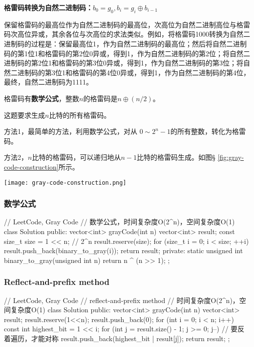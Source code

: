 \textbf{格雷码转换为自然二进制码：$b_0=g_0, b_i=g_i \oplus b_{i-1}$}

保留格雷码的最高位作为自然二进制码的最高位，次高位为自然二进制高位与格雷码次高位异或，其余各位与次高位的求法类似。例如，将格雷码1000转换为自然二进制码的过程是：保留最高位1，作为自然二进制码的最高位；然后将自然二进制码的第1位1和格雷码的第2位0异或，得到1，作为自然二进制码的第2位；将自然二进制码的第2位1和格雷码的第3位0异或，得到1，作为自然二进制码的第3位；将自然二进制码的第3位1和格雷码的第4位0异或，得到1，作为自然二进制码的第4位，最终，自然二进制码为1111。

格雷码有\textbf{数学公式}，整数$n$的格雷码是$n \oplus (n/2)$。

这题要求生成$n$比特的所有格雷码。

方法1，最简单的方法，利用数学公式，对从 $0\sim2^n-1$的所有整数，转化为格雷码。

方法2，$n$比特的格雷码，可以递归地从$n-1$比特的格雷码生成。如图\S 
\ref{fig:gray-code-construction}所示。

\begin{center}
	\texttt{[image: gray-code-construction.png]}\\
	\label{fig:gray-code-construction}
\end{center}


\subsubsection{数学公式}
\begin{Code}
	// LeetCode, Gray Code
	// 数学公式，时间复杂度O(2^n)，空间复杂度O(1)
	class Solution {
		public:
		vector<int> grayCode(int n) {
			vector<int> result;
			const size_t size = 1 << n;  // 2^n
			result.reserve(size);
			for (size_t i = 0; i < size; ++i)
			result.push_back(binary_to_gray(i));
			return result;
		}
		private:
		static unsigned int binary_to_gray(unsigned int n) {
			return n ^ (n >> 1);
		}
	};
\end{Code}


\subsubsection{Reflect-and-prefix method}
\begin{Code}
	// LeetCode, Gray Code
	// reflect-and-prefix method
	// 时间复杂度O(2^n)，空间复杂度O(1)
	class Solution {
		public:
		vector<int> grayCode(int n) {
			vector<int> result;
			result.reserve(1<<n);
			result.push_back(0);
			for (int i = 0; i < n; i++) {
				const int highest_bit = 1 << i;
				for (int j = result.size() - 1; j >= 0; j--) // 要反着遍历，才能对称
				result.push_back(highest_bit | result[j]);
			}
			return result;
		}
	};
\end{Code}


